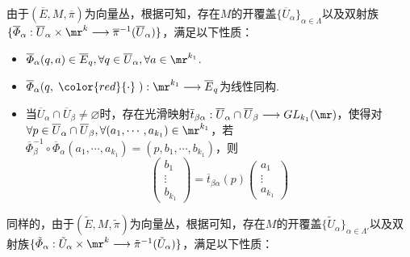 由于$(\overline{E},M,\overline{\pi})$为向量丛，根据可知，存在$M$的开覆盖$\{\overline{U}_{\alpha} \}_{\alpha\in \Lambda}$以及双射族$\{\overline{\varPhi}_{\alpha}:\overline{U}_{\alpha}\times \mr^{k}\longrightarrow \overline{\pi}^{-1}(\overline{U}_{\alpha}) \}$，满足以下性质：
\begin{itemize}
	\item[(1)] $\overline{\varPhi}_{\alpha}(q,a)\in \overline{E}_{q},\forall q\in \overline{U}_{\alpha},\forall a\in \mr^{k_{1}}$.
	\item[(2)] $\overline{\varPhi}_{\alpha}(q,\;{\color{red}{\cdot}}\;):\mr^{k_{1}}\longrightarrow \overline{E}_{q}$为线性同构.
	\item[(3)] 当$\overline{U}_{\alpha}\cap \overline{U}_{\beta}\neq\varnothing$时，存在光滑映射$\overline{t}_{\beta\alpha}:\overline{U}_{\alpha}\cap \overline{U}_{\beta}\longrightarrow GL_{k_{1}}(\mr)$，使得对$\forall p\in \overline{U}_{\alpha}\cap \overline{U}_{\beta},\forall (a_{1},\cdots,a_{k_{1}})\in \mr^{k_{1}}$，若$\overline{\varPhi}_{\beta}^{-1}\circ\overline{\varPhi}_{\alpha}(a_{1},\cdots,a_{k_{1}})=(p,b_{1},\cdots,b_{k_{1}})$，则
	\[
	\left( \begin{array}{ccc}{b_{1}} \\ {\vdots}  \\ {b_{k_{1}}} \end{array}\right)=\overline{t}_{\beta\alpha}(p) \left( \begin{array}{ccc}{a_{1}} \\ {\vdots}  \\ {a_{k_{1}}} \end{array}\right)
	\]
\end{itemize}
同样的，由于$(\tilde{E},M,\tilde{\pi})$为向量丛，根据可知，存在$M$的开覆盖$\{\tilde{U}_{\alpha} \}_{\alpha\in \Lambda'}$以及双射族$\{\tilde{\varPhi}_{\alpha}:\tilde{U}_{\alpha}\times \mr^{k}\longrightarrow \tilde{\pi}^{-1}(\tilde{U}_{\alpha}) \}$，满足以下性质：
